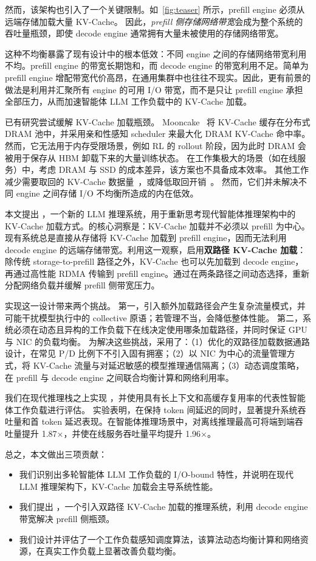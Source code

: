 然而，该架构也引入了一个关键限制。如~\autoref{fig:teaser} 所示，prefill engine 必须从远端存储加载大量 KV-Cache。
因此，\emph{prefill 侧存储网络带宽}会成为整个系统的吞吐量瓶颈，即使 decode engine 通常拥有大量未被使用的存储网络带宽。

这种不均衡暴露了现有设计中的根本低效：不同 engine 之间的存储网络带宽利用不均。prefill engine 的带宽长期饱和，而 decode engine 的带宽利用不足。简单为 prefill engine 增配带宽代价高昂，在通用集群中也往往不现实。因此，更有前景的做法是利用并汇聚所有 engine 的可用 I/O 带宽，而不是只让 prefill engine 承担全部压力，从而加速智能体 LLM 工作负载中的 KV-Cache 加载。

已有研究尝试缓解 KV-Cache 加载瓶颈。
Mooncake~\cite{FAST25:Mooncake} 将 KV-Cache 缓存在分布式 DRAM 池中，并采用亲和性感知 scheduler 来最大化 DRAM KV-Cache 命中率。
然而，它无法用于内存受限场景，例如 RL 的 rollout 阶段，因为此时 DRAM 会被用于保存从 HBM 卸载下来的大量训练状态。
在工作集极大的场景（如在线服务）中，考虑 DRAM 与 SSD 的成本差异，该方案也不具备成本效率。
其他工作减少需要取回的 KV-Cache 数据量~\cite{EuroSys25:HCache}，或降低取回开销~\cite{APSys25:TARDIS, SC25:Phoenix}。
然而，它们并未解决不同 engine 之间存储 I/O 不均衡所造成的内在低效。


本文提出 \sysname，一个新的 LLM 推理系统，用于重新思考现代智能体推理架构中的 KV-Cache 加载方式。\sysname 的核心洞察是：KV-Cache 加载并不必须以 prefill 为中心。现有系统总是直接从存储将 KV-Cache 加载到 prefill engine，因而无法利用 decode engine 的远端存储带宽。\sysname 利用这一观察，启用\textbf{双路径 KV-Cache 加载}：除传统 storage-to-prefill 路径之外，KV-Cache 也可以先加载到 decode engine，再通过高性能 RDMA 传输到 prefill engine。通过在两条路径之间动态选择，\sysname 重新分配网络负载并缓解 prefill 侧带宽压力。

实现这一设计带来两个挑战。
第一，引入额外加载路径会产生复杂流量模式，并可能干扰模型执行中的 collective 原语；若管理不当，会降低整体性能。
第二，系统必须在动态且异构的工作负载下在线决定使用哪条加载路径，并同时保证 GPU 与 NIC 的负载均衡。
为解决这些挑战，\sysname 采用了：（1）优化的双路径加载数据通路设计，在常见 P/D 比例下不引入固有拥塞；（2）以 NIC 为中心的流量管理方式，将 KV-Cache 流量与对延迟敏感的模型推理通信隔离；（3）动态调度策略，在 prefill 与 decode engine 之间联合均衡计算和网络利用率。

我们在现代推理栈之上实现 \sysname，并使用具有长上下文和高缓存复用率的代表性智能体工作负载进行评估。
实验表明，\sysname 在保持 token 间延迟的同时，显著提升系统吞吐量和首 token 延迟表现。在智能体推理场景中，\sysname 对离线推理最高可将端到端吞吐量提升 1.87$\times$，并使在线服务吞吐量平均提升 1.96$\times$。

总之，本文做出三项贡献：
\begin{itemize}[leftmargin=*]
  \item 我们识别出多轮智能体 LLM 工作负载的 I/O-bound 特性，并说明在现代 LLM 推理架构下，KV-Cache 加载会主导系统性能。
  \item 我们提出 \sysname，一个引入双路径 KV-Cache 加载的推理系统，利用 decode engine 带宽解决 prefill 侧瓶颈。
  \item 我们设计并评估了一个工作负载感知调度算法，该算法动态均衡计算和网络资源，在真实工作负载上显著改善负载均衡。
\end{itemize}
